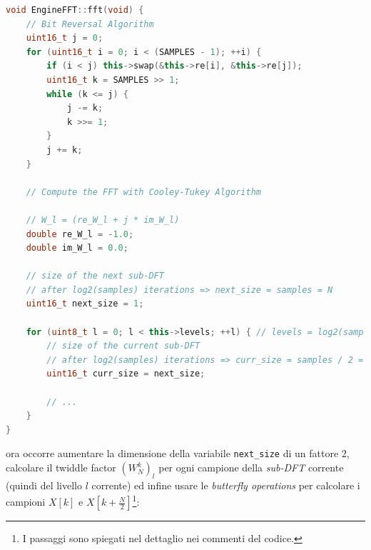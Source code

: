 \documentclass[a4paper,12pt]{report}  %
\newcommand{\lstinlinebg}[1]{\colorbox{backcolour}{\lstinline|#1|}}
\begin{document}
\begin{lstlisting}[language=C++, keywords={void, uint16_t, while, for, if, double, this, uint8_t}]
void EngineFFT::fft(void) {
    // Bit Reversal Algorithm
    uint16_t j = 0;
    for (uint16_t i = 0; i < (SAMPLES - 1); ++i) {
        if (i < j) this->swap(&this->re[i], &this->re[j]);
        uint16_t k = SAMPLES >> 1;
        while (k <= j) {
            j -= k;
            k >>= 1;
        }
        j += k;
    }

    // Compute the FFT with Cooley-Tukey Algorithm

    // W_l = (re_W_l + j * im_W_l)
    double re_W_l = -1.0;
    double im_W_l = 0.0;

    // size of the next sub-DFT
    // after log2(samples) iterations => next_size = samples = N
    uint16_t next_size = 1;
    
    for (uint8_t l = 0; l < this->levels; ++l) { // levels = log2(samples)
        // size of the current sub-DFT
        // after log2(samples) iterations => curr_size = samples / 2 = N / 2
        uint16_t curr_size = next_size;

        // ...
    }
}
\end{lstlisting}

ora occorre aumentare la dimensione della variabile \lstinlinebg{next_size} di un fattore $2$, calcolare il twiddle factor $\left ( W_N^{k} \right )_l$ per ogni campione della \textit{sub-DFT} corrente (quindi del livello $l$ corrente) ed infine usare le \textit{butterfly operations} per calcolare i campioni $X[k]$ e $X[k + \frac{N}{2}]$\footnote{I passaggi sono spiegati nel dettaglio nei commenti del codice.}:
\end{document}
